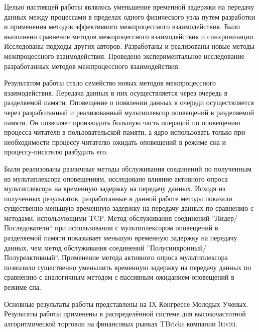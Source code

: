 \startconclusionpage

Целью настоящей работы являлось уменьшение временной задержки на передачу данных между процессами в пределах одного физического узла путем разработки и применения методов эффективного межпроцессного взаимодействия. Было выполнено сравнение методов межпроцессного взаимодействия и синхронизации. Исследованы подходы других авторов. Разработаны и реализованы новые методы межпроцессного взаимодействия. Проведено экспериментальное исследование разработанных методов межпроцессного взаимодействия.

Результатом работы стало семейство новых методов межпроцессного взаимодействия. Передача данных в них осуществляется через очередь в разделяемой памяти. Оповещение о появлении данных в очереди осуществляется через разработанный и реализованный мультиплексор оповещений в разделяемой памяти. Он позволяет производить большую часть операций по оповещению процесса-читателя в пользовательской памяти, а ядро использовать только при необходимости процессу-читателю ожидать оповещений в режиме сна и процессу-писателю разбудить его.

Были реализованы различные методы обслуживания соединений по полученным из мультиплексора оповещениям, исследовано влияние активного опроса мультиплексора на временную задержку на передачу данных. Исходя из полученных результатов, разработанные в данной работе методы показали существенно меньшую временную задержку на передачу данных по сравнению с методами, использующими TCP. Метод обслуживания соединений ''Лидер/Последователи`` при использовании с мультиплексором оповещений в разделяемой памяти показывает  меньшую временную задержку на передачу данных, чем метод обслуживания соединений ''Полусинхронный/Полуреактивный``. Применение метода активного опроса мультиплексора позволило существенно уменьшить временную задержку на передачу данных по сравнению с аналогичным методом с пассивным ожиданием оповещений в режиме сна.

Основные результаты работы представлены на IX Конгрессе Молодых Ученых. Результаты работы применены в распределённой системе для высокочастотной алгоритмической торговли на финансовых рынках TBricks компании Itiviti.